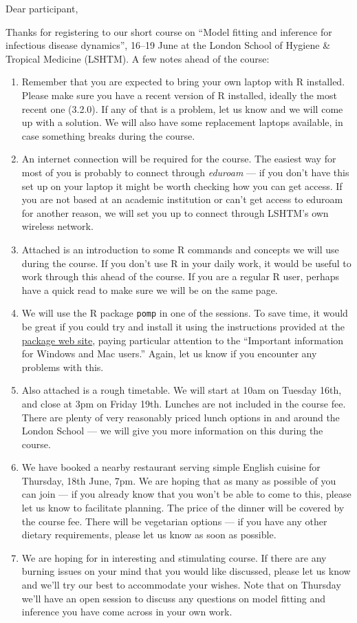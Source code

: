 \documentclass[paper=a4, 11pt]{scrlttr2}
\begin{document}
\begin{letter}{}
\opening{Dear participant,}
Thanks for registering to our short course on ``Model fitting and
inference for infectious disease dynamics'', 16--19 June at the London
School of Hygiene \& Tropical Medicine (LSHTM). A few notes ahead of
the course:

\begin{enumerate}
\item Remember that you are expected to bring your own laptop with R
installed. Please make sure you have a recent version of R installed,
ideally the most recent one (3.2.0). If any of that is a problem, let us know
and we will come up with a solution. We will also have some replacement laptops
available, in case something breaks during the course.
\item An internet connection will be required for the course. The easiest
way for most of you is probably to connect through \emph{eduroam} --- if you
don't have this set up on your laptop it might be worth checking how you
can get access. If you are not based at an academic institution or can't
get access to eduroam for another reason, we will set you up to connect
through LSHTM's own wireless network.
\item Attached is an introduction to some R commands and concepts
we will use during the course. If you don't use R in your daily work, it
would be useful to work through this ahead of the course. If you are a
regular R user, perhaps have a quick read to 
make sure we will be on the same page.
\item We will use the R package \texttt{pomp} in one of the
  sessions. To save time, it would be great if you could try and
  install it using the instructions provided at the 
  \href{http://pomp.r-forge.r-project.org/vignettes/getting_started.html#installing-the-package}{package web site},
  paying particular attention to the ``Important information for
  Windows and Mac users.'' Again, let us know if you encounter any
  problems with this.
\item Also attached is a rough timetable. We will start at 10am on Tuesday 16th,
and close at 3pm on Friday 19th. Lunches are not included in the
course fee. There are plenty of very reasonably priced lunch options in
and around the London School --- we will give you more information on
this during the course.
\item We have booked a nearby restaurant serving simple English cuisine for
Thursday, 18th June, 7pm. We are hoping that as many as possible of you
can join --- if you already know that you won't be able to come to this,
please let us know to facilitate planning. The price of the dinner will
be covered by the course fee. There will be vegetarian options --- if you
have any other dietary requirements, please let us know as soon as
possible.
\item We are hoping for in interesting and stimulating course. If there are
any burning issues on your mind that you would like discussed, please
let us know and we'll try our best to accommodate your wishes. Note
that on Thursday we'll have an open session to discuss any
questions on model fitting and inference you
have come across in your own work.  


\end{enumerate}
\end{letter}
\end{document}
